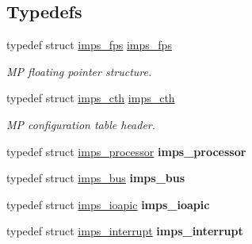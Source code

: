 \subsection*{Typedefs}
\begin{DoxyCompactItemize}
\item 
\mbox{\label{smp-imps_8h_ab45867b95399cf84219690769006a7a7}} 
typedef struct \mbox{\hyperlink{structimps__fps}{imps\+\_\+fps}} \mbox{\hyperlink{smp-imps_8h_ab45867b95399cf84219690769006a7a7}{imps\+\_\+fps}}
\begin{DoxyCompactList}\small\item\em MP floating pointer structure. \end{DoxyCompactList}\item 
\mbox{\label{smp-imps_8h_a8c74c7f2e48c603c6d15f2e3c1326840}} 
typedef struct \mbox{\hyperlink{structimps__cth}{imps\+\_\+cth}} \mbox{\hyperlink{smp-imps_8h_a8c74c7f2e48c603c6d15f2e3c1326840}{imps\+\_\+cth}}
\begin{DoxyCompactList}\small\item\em MP configuration table header. \end{DoxyCompactList}\item 
\mbox{\label{smp-imps_8h_a82b5a2804132cb213e6cff92f3f82a4a}} 
typedef struct \mbox{\hyperlink{structimps__processor}{imps\+\_\+processor}} {\bfseries imps\+\_\+processor}
\item 
\mbox{\label{smp-imps_8h_a62f5586cab9859598c2ac3a2d096c6fd}} 
typedef struct \mbox{\hyperlink{structimps__bus}{imps\+\_\+bus}} {\bfseries imps\+\_\+bus}
\item 
\mbox{\label{smp-imps_8h_a0ff69e6ecd951242bc89c493213fe03b}} 
typedef struct \mbox{\hyperlink{structimps__ioapic}{imps\+\_\+ioapic}} {\bfseries imps\+\_\+ioapic}
\item 
\mbox{\label{smp-imps_8h_a38a710a727f9e823b590f5fb103c7b00}} 
typedef struct \mbox{\hyperlink{structimps__interrupt}{imps\+\_\+interrupt}} {\bfseries imps\+\_\+interrupt}
\end{DoxyCompactItemize}
